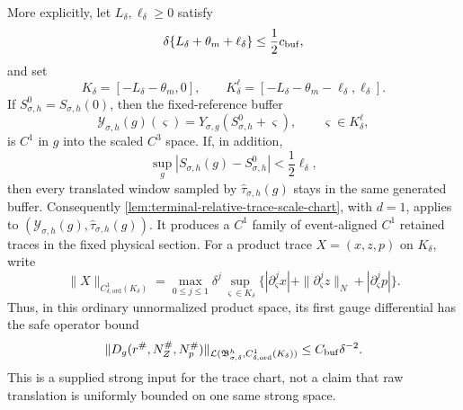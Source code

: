 \begin{proposition}
More explicitly, let \(L_\delta,\ell_\delta\ge0\) satisfy
\begin{equation}
 \delta\{L_\delta+\theta_m+\ell_\delta\}
 \le\frac12c_{\rm buf},                         \label{eq:strong-hit-window-budget}
\end{equation}
and set
\begin{equation}
 K_\delta=[-L_\delta-\theta_m,0],\qquad
 K_\delta^{\ell}
 =[-L_\delta-\theta_m-\ell_\delta,\ell_\delta].
                                                        \label{eq:strong-hit-moving-windows}
\end{equation}
If \(S_{\sigma,h}^0=S_{\sigma,h}(0)\), then the fixed-reference buffer
\begin{equation}
 \mathcal Y_{\sigma,h}(g)(\varsigma)
 =Y_{\sigma,g}(S_{\sigma,h}^0+\varsigma),\qquad
 \varsigma\in K_\delta^{\ell},                 \label{eq:strong-hit-reference-buffer}
\end{equation}
is \(C^1\) in \(g\) into the scaled \(C^3\) space.  If, in addition,
\begin{equation}
 \sup_g|S_{\sigma,h}(g)-S_{\sigma,h}^0|
 <\frac12\ell_\delta,                            \label{eq:strong-hit-chart-shift-budget}
\end{equation}
then every translated window sampled by
\(\widehat\tau_{\sigma,h}(g)\) stays in the same generated buffer.
Consequently \cref{lem:terminal-relative-trace-scale-chart}, with
\(d=1\), applies to
\((\mathcal Y_{\sigma,h}(g),\widehat\tau_{\sigma,h}(g))\).
It produces a \(C^1\) family of event-aligned \(C^1\) retained traces in
the fixed physical section.  For a product trace \(X=(x,z,p)\) on
\(K_\delta\), write
\begin{equation*}
 \|X\|_{C^1_{\delta,\mathrm{ord}}(K_\delta)}
 =\max_{0\le j\le1}\delta^j
   \sup_{\varsigma\in K_\delta}
       \bigl\{|\partial_\varsigma^jx|
              +\|\partial_\varsigma^jz\|_N
              +|\partial_\varsigma^jp|\bigr\}.
\end{equation*}
Thus, in this ordinary unnormalized product space, its first gauge
differential has the safe operator bound
\begin{equation}
 \|D_g(r^\#,N_Z^\#,N_p^\#)\|_{\mathcal L(
       \mathfrak B_{\sigma,\delta}^h,
       C^1_{\delta,\mathrm{ord}}(K_\delta))}
 \le C_{\rm buf}\delta^{-2}.                    \label{eq:strong-hit-recut-loss}
\end{equation}
This is a supplied strong input for the trace chart, not a claim that raw
translation is uniformly bounded on one same strong space.


\end{proposition}
